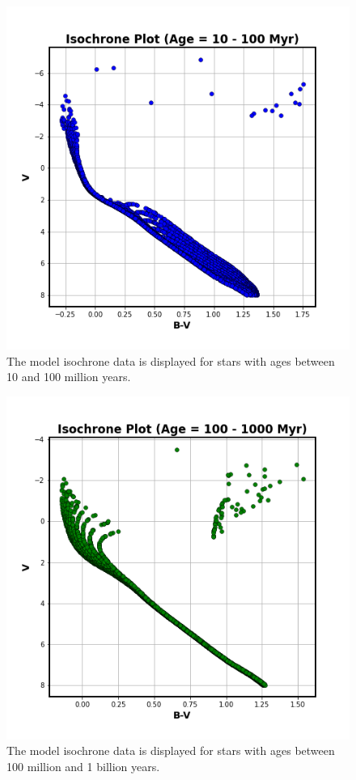 \documentclass[linenumbers]{aastex631}
\begin{document}
\begin{figure}
    \centering
    \includegraphics[scale = 0.5]{pngs/iso7.png}
    \caption{\label{fig:iso7} The model isochrone data is displayed for stars with ages between 10 and 100 million years.}
    \label{fig:iso7}
\end{figure}
\begin{figure}
    \centering
    \includegraphics[scale = 0.5]{pngs/iso8.png}
    \caption{\label{fig:iso8} The model isochrone data is displayed for stars with ages between 100 million and 1 billion years.}
    \label{fig:iso8}
\end{figure}
\end{document}

